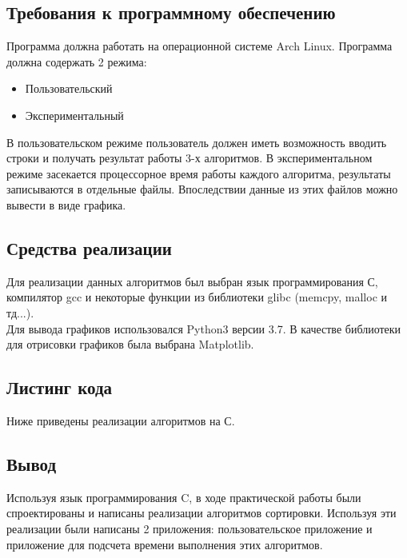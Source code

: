 \documentclass[a4paper,12pt]{article}
\begin{document}
\subsection{Требования к программному обеспечению}

Программа должна работать на операционной системе Arch Linux. Программа должна содержать 2 режима:
\begin{itemize}
\item Пользовательский
\item Экспериментальный
\end{itemize}
В пользовательском режиме пользователь должен иметь возможность вводить строки и получать результат работы 3-х алгоритмов. В экспериментальном режиме засекается процессорное время работы каждого алгоритма, результаты записываются в отдельные файлы. Впоследствии данные из этих файлов можно вывести в виде графика.

\newpage
\subsection{Средства реализации}
Для реализации данных алгоритмов был выбран язык программирования С, компилятор gcc и некоторые функции из библиотеки glibc (memcpy, malloc и тд...). \\
Для вывода графиков использовался Python3 версии 3.7. В качестве библиотеки для отрисовки графиков была выбрана Matplotlib.

\newpage
\subsection{Листинг кода}
Ниже приведены реализации алгоритмов на С.\\


\newpage

\newpage


\newpage
\subsection{Вывод}
Используя язык программирования C, в ходе практической работы были спроектированы и написаны реализации алгоритмов сортировки. Используя эти реализации были написаны 2 приложения: пользовательское приложение и приложение для подсчета времени выполнения этих алгоритмов.
\end{document}
